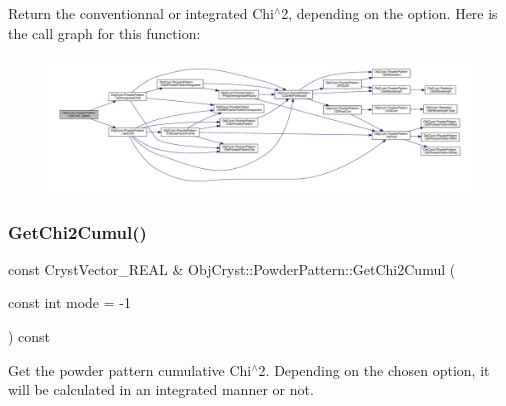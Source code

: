 Return the conventionnal or integrated Chi$^\wedge$2, depending on the option. Here is the call graph for this function\+:
\nopagebreak
\begin{figure}[H]
\begin{center}
\leavevmode
\includegraphics[width=350pt]{class_obj_cryst_1_1_powder_pattern_ae76721ca73e29a776de4b20fc23514a6_cgraph}
\end{center}
\end{figure}
\mbox{\label{class_obj_cryst_1_1_powder_pattern_a9da47365d83b105f22c006bd7145ed23}} 
\subsubsection{\texorpdfstring{GetChi2Cumul()}{GetChi2Cumul()}}
{\footnotesize\ttfamily const Cryst\+Vector\+\_\+\+R\+E\+AL \& Obj\+Cryst\+::\+Powder\+Pattern\+::\+Get\+Chi2\+Cumul (\begin{DoxyParamCaption}\item[{const int}]{mode = {\ttfamily -\/1} }\end{DoxyParamCaption}) const}

Get the powder pattern cumulative Chi$^\wedge$2. Depending on the chosen option, it will be calculated in an integrated manner or not.

